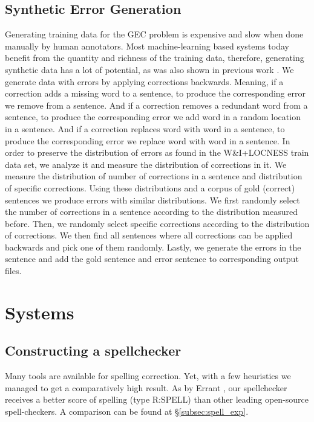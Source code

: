 \documentclass[11pt,a4paper]{article}
\begin{document}
\subsection{Synthetic Error Generation} \label{sec:synth}
Generating training data for the GEC problem is expensive and slow when done manually by human annotators. Most machine-learning based systems today benefit from the quantity and richness of the training data, therefore, generating synthetic data has a lot of potential, as was also shown in previous work \cite{felice2014generating}.
We generate data with errors by applying corrections backwards. Meaning, if a correction adds a missing word  to a sentence, to produce the corresponding error we remove  from a sentence. And if a correction removes a redundant word  from a sentence, to produce the corresponding error we add word  in a random location in a sentence. And if a correction replaces word  with word  in a sentence, to produce the corresponding error we replace word  with word  in a sentence.
In order to preserve the distribution of errors as found in the W\&I+LOCNESS train data set, we analyze it and measure the distribution of corrections in it. We measure the distribution of number of corrections in a sentence and distribution of specific corrections. Using these distributions and a corpus of gold (correct) sentences we produce errors with similar distributions.
We first randomly select the number of corrections in a sentence according to the distribution measured before. Then, we randomly select specific corrections according to the distribution of corrections. We then find all sentences where all corrections can be applied backwards and pick one of them randomly. Lastly, we generate the errors in the sentence and add the gold sentence and error sentence to corresponding output files. \section{Systems} \label{sec:systems}
\subsection{Constructing a spellchecker}\label{subsec:spell}
Many tools are available for spelling correction. Yet, with a few heuristics we managed to get a comparatively high result. As by Errant \cite{Bryant2017AutomaticAA}, our spellchecker receives a better  score of spelling (type R:SPELL) than other leading open-source spell-checkers.  A comparison can be found at \S \ref{subsec:spell_exp}. 
\end{document}
